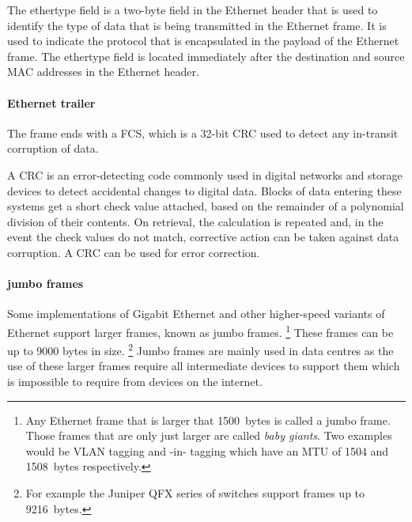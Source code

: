 The ethertype field is a two-byte field in the Ethernet header that is used to identify the type of data that is being transmitted in the Ethernet frame.
It is used to indicate the protocol that is encapsulated in the payload of the Ethernet frame.
The ethertype field is located immediately after the destination and source \acs{MAC} addresses in the Ethernet header.





\paragraph{Ethernet trailer}
The frame ends with a \acf{FCS}, which is a 32-bit \acf{CRC} used to detect any in-transit corruption of data.

A \acs{CRC} is an error-detecting code commonly used in digital networks and storage devices to detect accidental changes to digital data.
Blocks of data entering these systems get a short check value attached, based on the remainder of a polynomial division of their contents.
On retrieval, the calculation is repeated and, in the event the check values do not match, corrective action can be taken against data corruption.
A \acs{CRC} can be used for error correction.

\paragraph{jumbo frames} 
Some implementations of Gigabit Ethernet and other higher-speed variants of Ethernet support larger frames, known as jumbo frames.%
   \footnote{%
      Any Ethernet frame that is larger that {1500}~bytes is called a jumbo frame.
      Those frames that are only just larger are called \emph{baby giants}.
      Two examples would be \acs{VLAN} tagging and -in- tagging which have an \acs{MTU} of {1504} and {1508}~bytes respectively.}
These frames can be up to 9000 bytes in size.%
   \footnote{For example the Juniper QFX series of switches support frames up to {9216}~bytes.}
Jumbo frames are mainly used in data centres as the use of these larger frames require all intermediate devices to support them which is impossible to require from devices on the internet.


